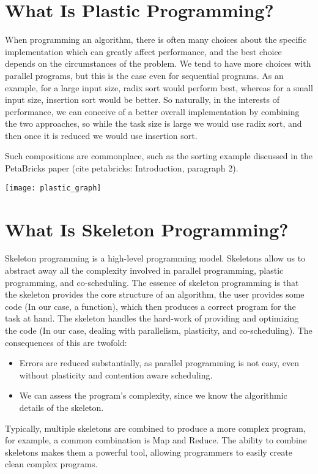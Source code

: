 \section{What Is Plastic Programming?}

When programming an algorithm, there is often many choices about the specific implementation which can greatly affect performance, and the best choice depends on the circumstances of the problem. We tend to have more choices with parallel programs, but this is the case even for sequential programs. As an example, for a large input size, radix sort would perform best, whereas for a small input size, insertion sort would be better. So naturally, in the interests of performance, we can conceive of a better overall implementation by combining the two approaches, so while the task size is large we would use radix sort, and then once it is reduced we would use insertion sort. 

Such compositions are commonplace, such as the sorting example discussed in the PetaBricks paper (cite petabricks: Introduction, paragraph 2).

\begin{center}
	\texttt{[image: plastic\_graph]}
\end{center}



\section{What Is Skeleton Programming?}

Skeleton programming is a high-level programming model. Skeletons allow us to abstract away all the complexity involved in parallel programming, plastic programming, and co-scheduling. The essence of skeleton programming is that the skeleton provides the core structure of an algorithm, the user provides some code (In our case, a function), which then produces a correct program for the task at hand. The skeleton handles the hard-work of providing and optimizing the code (In our case, dealing with parallelism, plasticity, and co-scheduling). The consequences of this are twofold:

\begin{itemize}
	\item Errors are reduced substantially, as parallel programming is not easy, even without plasticity and contention aware scheduling.
	\item We can assess the program's complexity, since we know the algorithmic details of the skeleton.
\end{itemize}

Typically, multiple skeletons are combined to produce a more complex program, for example, a common combination is Map and Reduce. The ability to combine skeletons makes them a powerful tool, allowing programmers to easily create clean complex programs.